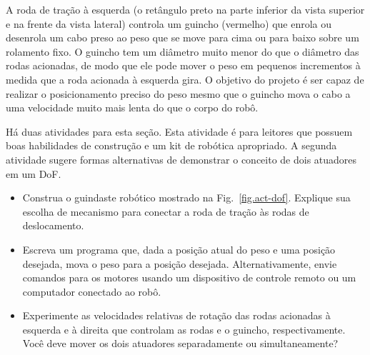 A roda de tração à esquerda (o retângulo preto na parte inferior da vista superior e na frente da vista lateral) controla um guincho (vermelho) que enrola ou desenrola um cabo preso ao peso que se move para cima ou para baixo sobre um rolamento fixo. O guincho tem um diâmetro muito menor do que o diâmetro das rodas acionadas, de modo que ele pode mover o peso em pequenos incrementos à medida que a roda acionada à esquerda gira. O objetivo do projeto é ser capaz de realizar o posicionamento preciso do peso mesmo que o guincho mova o cabo a uma velocidade muito mais lenta do que o corpo do robô.

Há duas atividades para esta seção. Esta atividade é para leitores que possuem boas habilidades de construção e um kit de robótica apropriado. A segunda atividade sugere formas alternativas de demonstrar o conceito de dois atuadores em um DoF.

\begin{framed}
\begin{itemize}
\item Construa o guindaste robótico mostrado na Fig.~\ref{fig.act-dof}. Explique sua escolha de mecanismo para conectar a roda de tração às rodas de deslocamento.
\item Escreva um programa que, dada a posição atual do peso e uma posição desejada, mova o peso para a posição desejada. Alternativamente, envie comandos para os motores usando um dispositivo de controle remoto ou um computador conectado ao robô.
\item Experimente as velocidades relativas de rotação das rodas acionadas à esquerda e à direita que controlam as rodas e o guincho, respectivamente. Você deve mover os dois atuadores separadamente ou simultaneamente?
\end{itemize}
\end{framed}

